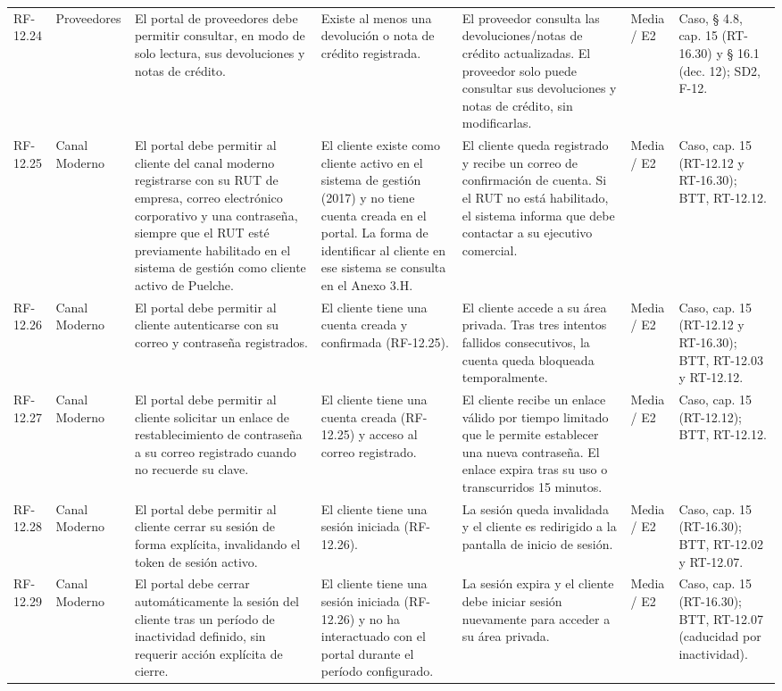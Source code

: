 {\begin{longtable}{@{}F{0.062} F{0.080} F{0.195} F{0.160} F{0.240} F{0.093} F{0.170}@{}}
  RF-12.24 & Proveedores & El portal de proveedores debe permitir consultar, en modo de solo lectura, sus devoluciones y notas de crédito. & Existe al menos una devolución o nota de crédito registrada. & El proveedor consulta las devoluciones/notas de crédito actualizadas. El proveedor solo puede consultar sus devoluciones y notas de crédito, sin modificarlas. & Media / E2 & Caso, § 4.8, cap. 15 (RT-16.30) y § 16.1 (dec. 12); SD2, F-12. \\
  RF-12.25 & Canal Moderno & El portal debe permitir al cliente del canal moderno registrarse con su RUT de empresa, correo electrónico corporativo y una contraseña, siempre que el RUT esté previamente habilitado en el sistema de gestión como cliente activo de Puelche. & El cliente existe como cliente activo en el sistema de gestión (2017) y no tiene cuenta creada en el portal. La forma de identificar al cliente en ese sistema se consulta en el Anexo 3.H. & El cliente queda registrado y recibe un correo de confirmación de cuenta. Si el RUT no está habilitado, el sistema informa que debe contactar a su ejecutivo comercial. & Media / E2 & Caso, cap. 15 (RT-12.12 y RT-16.30); BTT, RT-12.12. \\
  RF-12.26 & Canal Moderno & El portal debe permitir al cliente autenticarse con su correo y contraseña registrados. & El cliente tiene una cuenta creada y confirmada (RF-12.25). & El cliente accede a su área privada. Tras tres intentos fallidos consecutivos, la cuenta queda bloqueada temporalmente. & Media / E2 & Caso, cap. 15 (RT-12.12 y RT-16.30); BTT, RT-12.03 y RT-12.12. \\
  RF-12.27 & Canal Moderno & El portal debe permitir al cliente solicitar un enlace de restablecimiento de contraseña a su correo registrado cuando no recuerde su clave. & El cliente tiene una cuenta creada (RF-12.25) y acceso al correo registrado. & El cliente recibe un enlace válido por tiempo limitado que le permite establecer una nueva contraseña. El enlace expira tras su uso o transcurridos 15 minutos. & Media / E2 & Caso, cap. 15 (RT-12.12); BTT, RT-12.12. \\
  RF-12.28 & Canal Moderno & El portal debe permitir al cliente cerrar su sesión de forma explícita, invalidando el token de sesión activo. & El cliente tiene una sesión iniciada (RF-12.26). & La sesión queda invalidada y el cliente es redirigido a la pantalla de inicio de sesión. & Media / E2 & Caso, cap. 15 (RT-16.30); BTT, RT-12.02 y RT-12.07. \\
  RF-12.29 & Canal Moderno & El portal debe cerrar automáticamente la sesión del cliente tras un período de inactividad definido, sin requerir acción explícita de cierre. & El cliente tiene una sesión iniciada (RF-12.26) y no ha interactuado con el portal durante el período configurado. & La sesión expira y el cliente debe iniciar sesión nuevamente para acceder a su área privada. & Media / E2 & Caso, cap. 15 (RT-16.30); BTT, RT-12.07 (caducidad por inactividad). \\

\end{longtable}}
